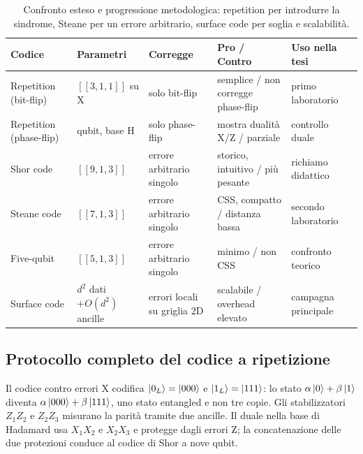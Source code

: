 \begin{onehalfspace}
\begin{table}[H]

\centering
\small
\begin{tabularx}{\textwidth}{@{}>{\raggedright\arraybackslash}p{2.0cm}>{\raggedright\arraybackslash}p{1.9cm}XXX@{}}
\toprule
\textbf{Codice} & \textbf{Parametri} & \textbf{Corregge} & \textbf{Pro / Contro} & \textbf{Uso nella tesi} \\
\midrule
Repetition (bit-flip) & $[[3,1,1]]$ su X & solo bit-flip & semplice / non corregge phase-flip & primo laboratorio \\
\addlinespace[0.3em]
Repetition (phase-flip) & 3 qubit, base H & solo phase-flip & mostra dualità X/Z / parziale & controllo duale \\
\addlinespace[0.3em]
Shor code & $[[9,1,3]]$ & errore arbitrario singolo & storico, intuitivo / più pesante & richiamo didattico~\cite{shorcorrection1995} \\
\addlinespace[0.3em]
Steane code & $[[7,1,3]]$ & errore arbitrario singolo & \ac{CSS}, compatto / distanza bassa & secondo laboratorio~\cite{steane1996} \\
\addlinespace[0.3em]
Five-qubit & $[[5,1,3]]$ & errore arbitrario singolo & minimo / non \ac{CSS} & confronto teorico \\
\addlinespace[0.3em]
Surface code & $d^2$ dati $+O(d^2)$ ancille & errori locali su griglia 2D & scalabile / overhead elevato & campagna principale~\cite{fowler2012} \\
\bottomrule
\end{tabularx}
\caption[Confronto tra codici correttori quantistici]{Confronto esteso e
progressione metodologica: repetition per introdurre la sindrome, Steane
per un errore arbitrario, surface code per soglia e scalabilità.}\label{tab:confronto_codici}

\end{table}

\subsection{Protocollo completo del codice a ripetizione}
\label{app:qec_repetition}

Il codice contro errori X codifica $\ket{0_L}=\ket{000}$ e
$\ket{1_L}=\ket{111}$: lo stato
$\alpha\ket{0}+\beta\ket{1}$ diventa
$\alpha\ket{000}+\beta\ket{111}$, uno stato entangled e non tre copie.
Gli stabilizzatori $Z_1Z_2$ e $Z_2Z_3$ misurano la parità tramite due
ancille. Il duale nella base di Hadamard usa $X_1X_2$ e $X_2X_3$ e
protegge dagli errori Z; la concatenazione delle due protezioni conduce
al codice di Shor a nove qubit.


\end{onehalfspace}
